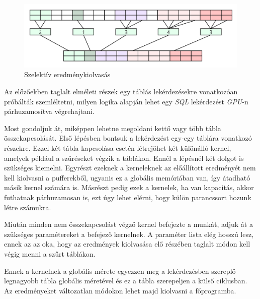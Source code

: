 \begin{figure}[h!]
\centering
\includegraphics[width=\textwidth]{images/copy_02.png}
\caption{Szelektív eredménykiolvasás}
\label{fig:copy_02}
\end{figure}

\newpage
{}

Az előzőekben taglalt elméleti részek egy táblás lekérdezésekre vonatkozóan próbálták szemléltetni, milyen logika alapján lehet egy \textit{SQL} lekérdezést \textit{GPU}-n párhuzamosítva végrehajtani.

Most gondoljuk át, miképpen lehetne megoldani kettő vagy több tábla összekapcsolását. 
Első lépésben bontsuk a lekérdezést egy-egy táblára vonatkozó részekre. Ezzel két tábla kapcsolása esetén létrejöhet két különálló kernel, amelyek például a szűréseket végzik a táblákon. Ennél a lépésnél két dolgot is szükséges kiemelni. Egyrészt ezeknek a kerneleknek az előállított eredményét nem kell kiolvasni a pufferekből, ugyanis ez a globális memóriában van, így átadható másik kernel számára is. Másrészt pedig ezek a kernelek, ha van kapacitás, akkor futhatnak párhuzamosan is, ezt úgy lehet elérni, hogy külön parancssort hozunk létre számukra.

Miután minden nem összekapcsolást végző kernel befejezte a munkát, adjuk át a szükséges paramétereket a befejező kernelnek. A paraméter lista elég hosszú lesz, ennek az az oka, hogy az eredmények kiolvasása elő részében taglalt módon kell végig menni a szűrt táblákon. 

Ennek a kernelnek a globális mérete egyezzen meg a lekérdezésben szereplő legnagyobb tábla globális méretével és ez a tábla szerepeljen a külső ciklusban. Az eredményeket változatlan módokon lehet majd kiolvasni a főprogramba.

